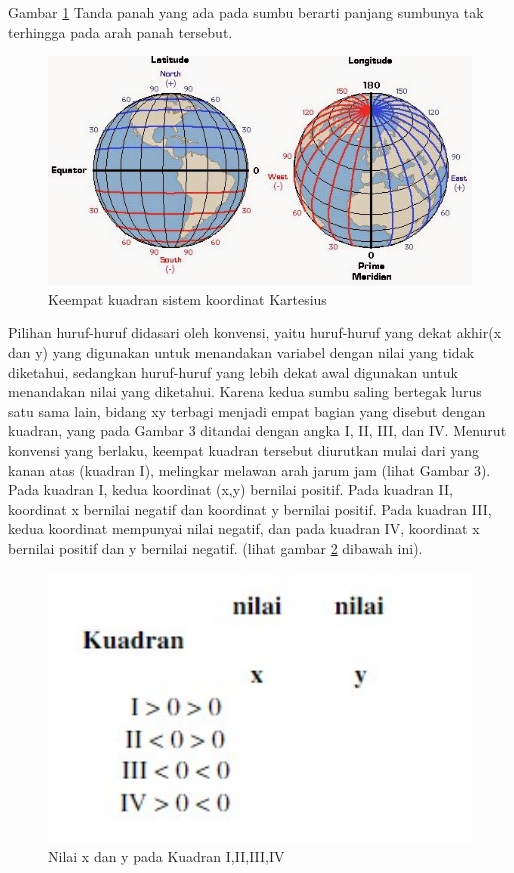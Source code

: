 Gambar \ref{koordinat} Tanda panah yang ada pada sumbu berarti panjang sumbunya tak terhingga pada arah panah tersebut.

\begin{figure}[ht]
    \centerline{\includegraphics[width=1\textwidth]{figures/koordinat.JPG}}
    \caption{Keempat kuadran sistem koordinat Kartesius}
    \label{koordinat}
    \end{figure}

Pilihan huruf-huruf didasari oleh konvensi, yaitu huruf-huruf yang dekat akhir(x dan y) yang digunakan untuk menandakan variabel dengan nilai yang tidak diketahui, sedangkan huruf-huruf yang lebih dekat awal digunakan untuk menandakan nilai yang diketahui. Karena kedua sumbu saling bertegak lurus satu sama lain, bidang xy terbagi menjadi empat bagian yang disebut dengan kuadran, yang pada Gambar 3 ditandai dengan angka I, II, III, dan IV. Menurut konvensi yang berlaku, keempat kuadran tersebut diurutkan mulai dari yang kanan atas (kuadran I), melingkar melawan arah jarum jam (lihat Gambar 3). Pada kuadran I, kedua koordinat (x,y) bernilai positif. Pada kuadran II, koordinat x bernilai negatif dan koordinat y bernilai positif. Pada kuadran III, kedua koordinat mempunyai nilai negatif, dan pada kuadran IV, koordinat x bernilai positif dan y bernilai negatif. (lihat gambar \ref{contoh} dibawah ini).

\begin{figure}[ht]
    \centerline{\includegraphics[width=1\textwidth]{figures/contoh.JPG}}
    \caption{Nilai x dan y pada Kuadran I,II,III,IV}
    \label{contoh}
    \end{figure}

